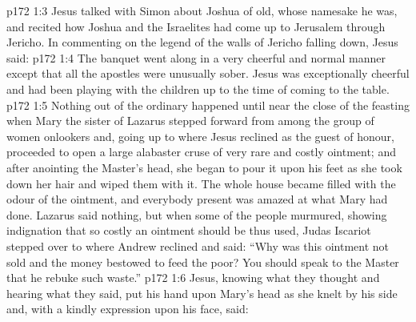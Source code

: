 \vs p172 1:3 Jesus talked with Simon about Joshua of old, whose namesake he was, and recited how Joshua and the Israelites had come up to Jerusalem through Jericho. In commenting on the legend of the walls of Jericho falling down, Jesus said: 
\vs p172 1:4 The banquet went along in a very cheerful and normal manner except that all the apostles were unusually sober. Jesus was exceptionally cheerful and had been playing with the children up to the time of coming to the table.
\vs p172 1:5 \pc Nothing out of the ordinary happened until near the close of the feasting when Mary the sister of Lazarus stepped forward from among the group of women onlookers and, going up to where Jesus reclined as the guest of honour, proceeded to open a large alabaster cruse of very rare and costly ointment; and after anointing the Master’s head, she began to pour it upon his feet as she took down her hair and wiped them with it. The whole house became filled with the odour of the ointment, and everybody present was amazed at what Mary had done. Lazarus said nothing, but when some of the people murmured, showing indignation that so costly an ointment should be thus used, Judas Iscariot stepped over to where Andrew reclined and said: “Why was this ointment not sold and the money bestowed to feed the poor? You should speak to the Master that he rebuke such waste.”
\vs p172 1:6 Jesus, knowing what they thought and hearing what they said, put his hand upon Mary’s head as she knelt by his side and, with a kindly expression upon his face, said: 
